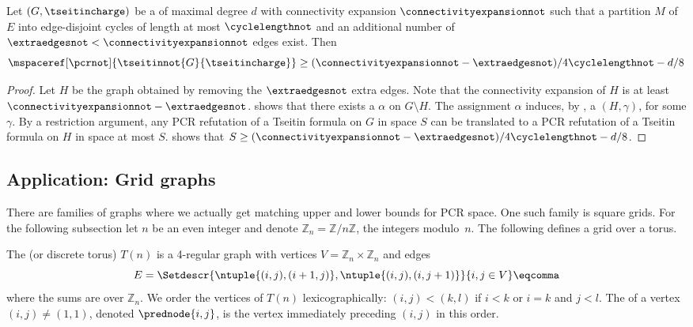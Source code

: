 \begin{corollary} \label{cor:tseitin-small-cycles-space-lower-bound}
  Let $(G,\tseitincharge)$ be a \Gnonsplitting \chargedgraph of maximal degree $d$ with connectivity expansion $\connectivityexpansionnot$ such that a partition $M$ of $E$ into edge-disjoint cycles of length at most $\cyclelengthnot$ and an additional number of $\extraedgesnot < \connectivityexpansionnot$ edges exist. Then
  \begin{equation*}
    \mspaceref[\pcrnot]{\tseitinnot{G}{\tseitincharge}}\geq (\connectivityexpansionnot-\extraedgesnot)/4\cyclelengthnot -d/8
  \end{equation*}
\end{corollary}
\begin{proof}
  Let $H$ be the graph obtained by removing the $\extraedgesnot$ extra
  edges. Note that the connectivity expansion of $H$ is at least
  $\connectivityexpansionnot-\extraedgesnot$.
  shows that there exists
  a \nonsplittingassignment $\alpha$ on $G \setminus H$.
  The assignment $\alpha$ induces, by
 , a \Gnonsplitting
  \chargedgraph $(H,\gamma)$, for some $\gamma$.
  By a restriction argument, any PCR refutation of a \Gnonsplitting
  Tseitin formula on $G$ in space $S$ can be translated to a PCR
  refutation of a \Gnonsplitting Tseitin formula on $H$ in space at
  most $S$.  shows
  that
  $S \geq (\connectivityexpansionnot-\extraedgesnot)/4\cyclelengthnot
  -d/8$.
\end{proof}

\subsection{Application: Grid graphs} \label{sec:grids}

There are families of graphs where we actually get matching upper and lower bounds for PCR space. One such family is square grids. For the following subsection let $n$ be an even integer and denote $\mathbb{Z}_n=\mathbb{Z}/n\mathbb{Z}$, the integers modulo~$n$. The following defines a grid over a torus.

\begin{definition}
  \label{def:grid-graph}
  The  (or discrete torus) $T(n)$ is a 4-regular graph with vertices $V=\mathbb{Z}_n\times\mathbb{Z}_n$ and edges
  \begin{equation*}
    E=\Setdescr{\ntuple{(i,j),(i+1,j)},\ntuple{(i,j),(i,j+1)}}{i,j\in V}\eqcomma
  \end{equation*}
  where the sums are over $\mathbb{Z}_n$.
  We order the vertices of $T(n)$ lexicographically: $(i,j) < (k,l)$ if $i<k$ or $i=k$ and $j<l$. The  of a vertex $(i,j) \neq (1,1)$, denoted $\prednode{i,j}$, is the vertex immediately preceding $(i,j)$ in this order.
\end{definition}

